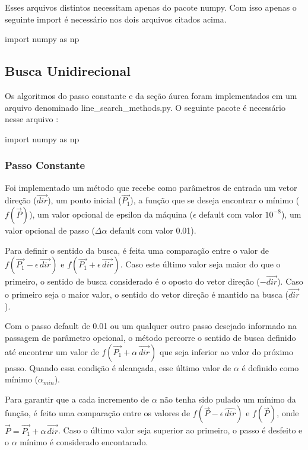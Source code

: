 \documentclass[10pt, a4paper]{article}
\begin{document}
Esses arquivos distintos necessitam apenas do pacote numpy. Com isso apenas o seguinte import é necessário nos dois arquivos citados acima.

\begin{python}
  import numpy as np
\end{python}

\subsection{Busca Unidirecional}
Os algoritmos do passo constante e da seção áurea foram implementados em um arquivo denominado line\_search\_methods.py. O seguinte pacote é necessário nesse arquivo : 
\begin{python}
  import numpy as np
\end{python}

\subsubsection{Passo Constante}


Foi implementado um método que recebe como parâmetros de entrada um vetor direção ($\overrightarrow{dir}$), um ponto inicial ($\overrightarrow{P_1}$), 
a função que se deseja encontrar o mínimo ($f(\overrightarrow{P})$), um valor opcional de epsilon da máquina ($\epsilon$ default com valor $10^{-8}$), um valor opcional de passo ($\Delta\alpha$ default com valor 0.01).

Para definir o sentido da busca, é feita uma comparação entre o valor de $f(\overrightarrow{P_1}-\epsilon\,\overrightarrow{dir})$ e $f(\overrightarrow{P_1}+\epsilon\,\overrightarrow{dir})$.
Caso este último valor seja maior do que o primeiro, o sentido de busca considerado é o oposto do vetor direção ($-\overrightarrow{dir}$). Caso o primeiro seja
o maior valor, o sentido do vetor direção é mantido na busca ($\overrightarrow{dir}$).

Com o passo default de 0.01 ou um qualquer outro passo desejado informado na passagem de parâmetro opcional, o método percorre o sentido
de busca definido até encontrar um valor de $f(\overrightarrow{P_1}+ \alpha\,\overrightarrow{dir})$ que seja inferior ao valor do próximo passo.
Quando essa condição é alcançada, esse último valor de $\alpha$ é definido como mínimo ($\alpha_{min}$). 

Para garantir que a cada incremento
de $\alpha$ não tenha sido pulado um mínimo da função, é feito uma comparação entre os valores de $f(\overrightarrow{P}-\epsilon\,\hat{dir})$ e $f(\overrightarrow{P})$, 
onde $\overrightarrow{P} = \overrightarrow{P_1} + \alpha\,\overrightarrow{dir}$. Caso o último valor seja superior ao primeiro, o passo é desfeito e o $\alpha$ mínimo é considerado encontarado.
\end{document}
